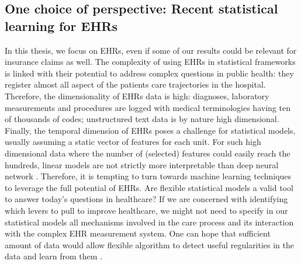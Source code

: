 \documentclass[french,12pt,twoside,a4paper]{book}
\begin{document}
\begin{background_box_left}


\end{background_box_left}


\subsection{One choice of perspective: Recent statistical learning for EHRs}%
\label{subsec:intro:focus_data}%

In this thesis, we focus on EHRs, even if some of our results could be relevant
for insurance claims as well. The complexity of using EHRs in statistical
frameworks is linked with their potential to address complex questions in public
health: they register almost all aspect of the patients care trajectories in the
hospital. Therefore, the dimensionality of EHRs data is high: diagnoses,
laboratory measurements and procedures are logged with medical terminologies
having ten of thousands of codes; unstructured text data is by nature high
dimensional. Finally, the temporal dimension of EHRs poses a challenge for
statistical models, usually assuming a static vector of features for each unit.
For such high dimensional data where the number of (selected) features could
easily reach the hundreds, linear models are not strictly more interpretable
than deep neural network \citep{lipton2018mythos}. Therefore, it is tempting to
turn towards machine learning techniques to leverage the full potential of EHRs.
% 
Are flexible statistical models a valid tool to answer today's questions in
healthcare? If we are concerned with identifying which levers to pull to improve
healthcare, we might not need to specify in our statistical models all
mechanisms involved in the care process and its interaction with the complex EHR
measurement system. One can hope that sufficient amount of data would allow flexible algorithm to
detect useful regularities in the data and learn from them
\citep{halevy2009unreasonable}.
\end{document}
